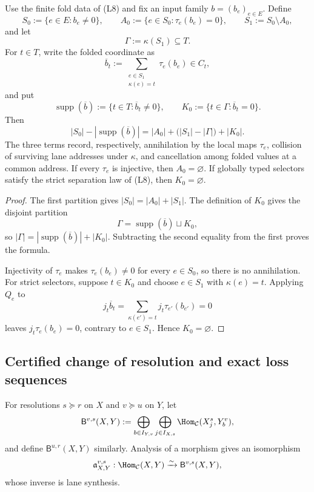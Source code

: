\begin{proposition}
\label{prop:block15-visible-support-ledger}
Use the finite fold data of (L8) and fix an input family
\(b=(b_e)_{e\in E}\).  Define
\[
 S_0:=\{e\in E:b_e\ne0\},
 \qquad
 A_0:=\{e\in S_0:\tau_e(b_e)=0\},
 \qquad
 S_1:=S_0\setminus A_0,
\]
and let
\[
 \Gamma:=\kappa(S_1)\subseteq T.
\]
For \(t\in T\), write the folded coordinate as
\[
 \overline b_t
 :=
 \sum_{\substack{e\in S_1\\\kappa(e)=t}}\tau_e(b_e)
 \in C_t,
\]
and put
\[
 \operatorname{supp}(\overline b)
 :=\{t\in T:\overline b_t\ne0\},
 \qquad
 K_0:=\{t\in\Gamma:\overline b_t=0\}.
\]
Then
\[
 \boxed{
 |S_0|-|\operatorname{supp}(\overline b)|
 =
 |A_0|
 +\bigl(|S_1|-|\Gamma|\bigr)
 +|K_0|.}
\]
The three terms record, respectively, annihilation by the local maps
\(\tau_e\), collision of surviving lane addresses under \(\kappa\), and
cancellation among folded values at a common address.  If every \(\tau_e\) is
injective, then \(A_0=\varnothing\).  If globally typed selectors satisfy the
strict separation law of (L8), then \(K_0=\varnothing\).
\end{proposition}

\begin{proof}
The first partition gives \(|S_0|=|A_0|+|S_1|\).  The definition of
\(K_0\) gives the disjoint partition
\[
 \Gamma
 =\operatorname{supp}(\overline b)\sqcup K_0,
\]
so \(|\Gamma|=|\operatorname{supp}(\overline b)|+|K_0|\).  Subtracting the
second equality from the first proves the formula.

Injectivity of \(\tau_e\) makes \(\tau_e(b_e)\ne0\) for every \(e\in S_0\),
so there is no annihilation.  For strict selectors, suppose
\(t\in K_0\) and choose \(e\in S_1\) with \(\kappa(e)=t\).  Applying \(Q_e\)
to
\[
 j_t\overline b_t
 =\sum_{\kappa(e')=t}j_t\tau_{e'}(b_{e'})=0
\]
leaves \(j_t\tau_e(b_e)=0\), contrary to \(e\in S_1\).  Hence
\(K_0=\varnothing\).
\end{proof}

\subsection{Certified change of resolution and exact loss sequences}
\label{subsec:block15-coarsening-loss}

For resolutions \(s\succeq r\) on \(X\) and \(v\succeq u\) on \(Y\), let
\[
 \mathsf B^{v,s}(X,Y)
 :=
 \bigoplus_{b\in I_{Y,v}}
 \bigoplus_{j\in I_{X,s}}
 \Hom_{\mathcal C}(X_j^s,Y_b^v),
\]
and define \(\mathsf B^{u,r}(X,Y)\) similarly.  Analysis of a morphism gives
an isomorphism
\[
 \mathfrak a^{v,s}_{X,Y}:
 \Hom_{\mathcal C}(X,Y)\xrightarrow{\sim}
 \mathsf B^{v,s}(X,Y),
\]
whose inverse is lane synthesis.

